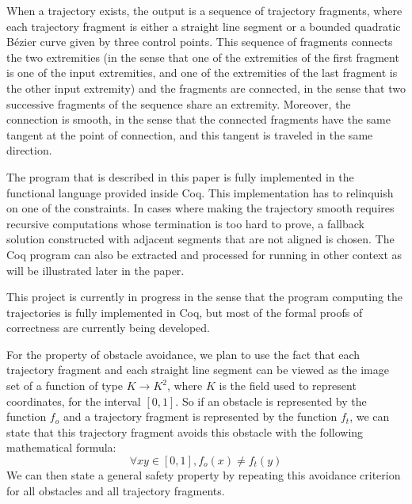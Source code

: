 \documentclass{easychair}
\begin{document}
When a trajectory exists, the output is a sequence of trajectory
fragments, where each trajectory
fragment is either a straight line segment or a bounded quadratic Bézier
curve given by three control points.  This sequence of fragments connects
the two extremities (in the sense that one of the extremities of the
first fragment is one of the input extremities, and one of the
extremities of the last fragment is the other input extremity) and the
fragments are connected, in the sense that two successive fragments of
the sequence share an extremity.  Moreover, the connection is smooth,
in the sense that the connected fragments have the same tangent at the
point of connection, and this tangent is traveled in the same direction.

The program that is described in this paper is fully implemented in
the functional language provided inside Coq.  This implementation has
to relinquish on one of the constraints.  In cases where making the
trajectory smooth requires recursive computations whose termination is
too hard to prove, a fallback solution constructed with
adjacent segments that are not aligned is chosen.  The Coq
program can also be extracted and processed for running in other
context as will be illustrated later in the paper.

This project is currently in progress in the sense that the program
computing the trajectories is fully implemented in Coq, but most of the
formal proofs of correctness are currently being developed.

For the property of obstacle avoidance, we plan to use the fact that
each trajectory fragment and each straight line segment can be viewed
as the image set of a function of type \(K \rightarrow K^2\), where \(K\) is
the field used to
represent coordinates, for the interval \([0,1]\).  So if an obstacle is
represented by the function \(f_o\) and a trajectory fragment is
represented by the function \(f_t\), we can state that this trajectory
fragment avoids this obstacle with the following mathematical formula:
\[\forall x y \in [0,1], f_o(x) \neq f_t(y)\]
We can then state a general safety property by repeating this avoidance
criterion for all obstacles and all trajectory fragments.
\end{document}
